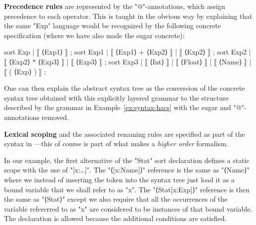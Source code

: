 \documentclass{article}
\begin{document}
\smallskip\noindent\textbf{Precedence rules} are represented by the "@"-annotations, which assign precedence to each
  operator. This is taught in the obvious way by explaining that the same "Exp" language would be
  recognized by the following concrete \HAX specification (where we have also made the sugar
  concrete):
\begin{hacs}[xleftmargin=\parindent]
sort Exp   | ⟦ ⟨Exp1⟩ ⟧ ;
sort Exp1  | ⟦ ⟨Exp1⟩ + ⟨Exp2⟩ ⟧ | ⟦ ⟨Exp2⟩ ⟧ ;
sort Exp2  | ⟦ ⟨Exp2⟩ * ⟨Exp3⟩ ⟧ | ⟦ ⟨Exp3⟩ ⟧ ;
sort Exp3  | ⟦ ⟨Int⟩ ⟧ | ⟦ ⟨Float⟩ ⟧ | ⟦ ⟨Name⟩ ⟧ | ⟦ ( ⟨Exp⟩ ) ⟧ ;
\end{hacs}
  One can then explain the abstract syntax tree as the conversion of the concrete syntax tree
  obtained with this explicitly layered grammar to the structure described by the \HAX grammar in
  Example~\ref{ex:syntax-hacs} with the sugar and "@"-annotations removed.

\smallskip\noindent\textbf{Lexical scoping} and the associated renaming rules are specified as part of the syntax in
  \HAX---this of course is part of what makes \HAX a \emph{higher order} formalism.

  In our example, the first alternative of the "Stat" sort declaration defines a static scope with
  the use of "[x:…]".  The "⟨[x:Name]⟩" reference is the same as "⟨Name⟩" where we instead of
  inserting the token into the syntax tree just load it as a bound variable that we shall refer to
  as "x".  The "⟨Stat[x:Exp]⟩" reference is then the same as "⟨Stat⟩" except we also require that
  all the occurrences of the variable refererred to as "x" are considered to be instances of that
  bound variable.  The declaration is allowed because the additional conditions are satisfied.
\end{document}
